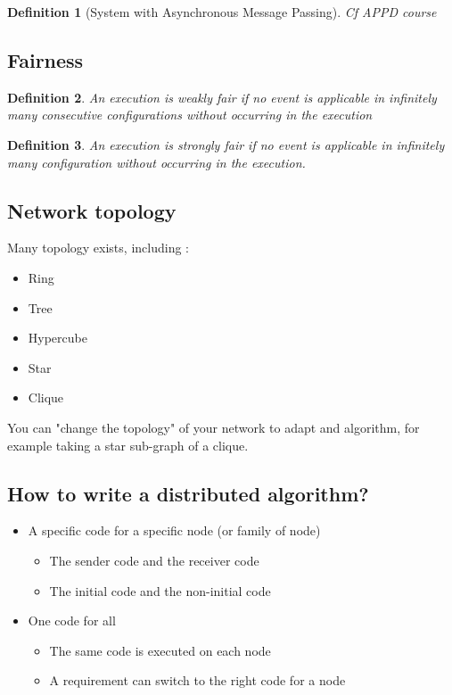 \documentclass{article}
\newtheorem{defi}{Definition}
\begin{document}
\begin{defi}[System with Asynchronous Message Passing]
Cf APPD course
\end{defi}


\subsection{Fairness}
\begin{defi}
An execution is \emph{weakly fair} if no event is applicable in infinitely many consecutive configurations without occurring in the execution
\end{defi}


\begin{defi}
An execution is \emph{strongly fair} if no event is applicable in infinitely many configuration without occurring in the execution.
\end{defi}


\subsection{Network topology}
Many topology exists, including :
\begin{itemize}
\item Ring
\item Tree
\item Hypercube
\item Star
\item Clique
\end{itemize}

You can "change the topology" of your network to adapt and algorithm, for example taking a star sub-graph of a clique.


\subsection{How to write a distributed algorithm?}
\begin{itemize}
\item A specific code for a specific node (or family of node)
\begin{itemize}
\item The sender code and the receiver code
\item The initial code and the non-initial code
\end{itemize}
\item One code for all
\begin{itemize}
\item The same code is executed on each node
\item A requirement can switch to the right code for a node
\end{itemize}
\end{itemize}
\end{document}
